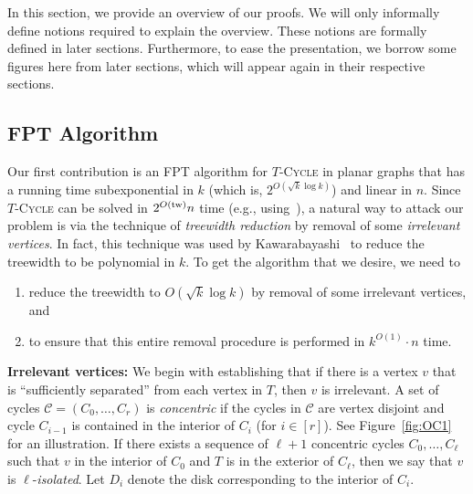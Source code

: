 \documentclass{article}
\newcommand{\tw}{{\rm tw}}
\numberwithin{claimcounter}{lemma}
\newcommand{\tcycle}{$T$-\textsc{Cycle}\xspace}
\begin{document}
In this section, we provide an overview of our proofs. We will only informally define notions  required to explain the overview. These notions are formally defined in later sections. Furthermore, to ease the presentation, we borrow some figures here from later sections, which will appear again in their respective sections. 
\subsection{FPT Algorithm}
Our first contribution is an FPT algorithm for \tcycle in planar graphs that has a running time subexponential in $k$ (which is, $2^{O(\sqrt{k}\log k)}$) and linear in $n$. Since \tcycle can be solved in $2^{O(\tw)} n$ time (e.g., using~\cite{DBLP:journals/jcss/DornFT12}), a natural way to attack our problem is via the technique of {\em treewidth reduction} by removal of  some {\em irrelevant vertices}. In fact, this technique was used by Kawarabayashi~\cite{kawarabayashi2008improved} to reduce the treewidth to be polynomial in $k$. To get the algorithm that we desire, we need to
\begin{enumerate}
    \item reduce the treewidth to $O(\sqrt{k} \log k)$ by removal of some irrelevant vertices, and
    \item  to ensure that this entire removal procedure is performed in $k^{O(1)}\cdot n$ time.
\end{enumerate}

\smallskip
\noindent\textbf{Irrelevant vertices:} We begin with establishing that if there is a vertex $v$ that is ``sufficiently separated'' from each vertex in $T$, then $v$ is irrelevant. 
A set of cycles $\mathcal{C} = (C_0,\ldots,C_r)$ is \textit{concentric} if the cycles in $\mathcal{C}$ are vertex disjoint and cycle $C_{i-1}$ is contained in the interior of $C_i$ (for $i\in [r]$). See Figure~\ref{fig:OC1} for an illustration. If there exists a sequence of $\ell+1$ concentric cycles $C_0,\ldots,C_{\ell}$ such that $v$ in the interior of $C_0$ and $T$ is in the exterior of $C_{\ell}$, then we say that $v$ is $\ell$-\textit{isolated}. Let $D_i$ denote the disk corresponding to the interior of $C_i$. 
\end{document}
